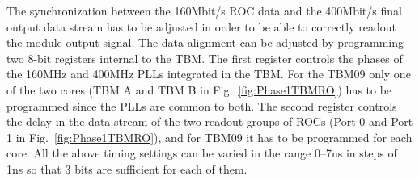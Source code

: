 The synchronization between the 160\unit{Mbit/s} ROC data and the 400\unit{Mbit/s} final output data stream has to be adjusted in order to be able to correctly readout the module output signal.
The data alignment can be adjusted by programming two 8-bit registers internal to the TBM.
The first register controls the phases of the 160\unit{MHz} and 400\unit{MHz} PLLs integrated in the TBM.
For the TBM09 only one of the two cores (TBM A and TBM B in Fig.~\ref{fig:Phase1TBMRO}) has to be programmed since the PLLs are common to both.
The second register controls the delay in the data stream of the two readout groups of ROCs (Port 0 and Port 1 in Fig.~\ref{fig:Phase1TBMRO}), and for TBM09 it has to be programmed for each core.
All the above timing settings can be varied in the range 0--7\unit{ns} in steps of 1\unit{ns} so that 3 bits are sufficient for each of them.

